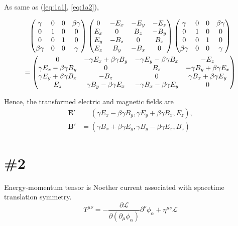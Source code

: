 \documentclass[a4paper,11pt]{article}
\begin{document}
As same as (\ref{eq:1a1}, \ref{eq:1a2}), 

\begin{gather}
    \begin{pmatrix}
        \gamma & 0 & 0 & \beta\gamma \\
        0 & 1 & 0 & 0 \\
        0 & 0 & 1 & 0 \\
        \beta\gamma & 0 & 0 & \gamma
    \end{pmatrix}
    \begin{pmatrix}
        0 & -E_x & -E_y & -E_z \\
        E_x & 0 & B_z & -B_y \\
        E_y & -B_z & 0 & B_x \\
        E_z & B_y & -B_x & 0
    \end{pmatrix}
    \begin{pmatrix}
        \gamma & 0 & 0 & \beta\gamma \\
        0 & 1 & 0 & 0 \\
        0 & 0 & 1 & 0 \\
        \beta\gamma & 0 & 0 & \gamma
    \end{pmatrix}\notag\\
    =\begin{pmatrix}
        0 & -\gamma E_x+\beta\gamma B_y & -\gamma E_y-\beta\gamma B_x & -E_z \\
        \gamma E_x - \beta\gamma B_y & 0 & B_z & -\gamma B_y+\beta\gamma E_x \\
        \gamma E_y + \beta\gamma B_x& -B_z & 0 & \gamma B_x+\beta\gamma E_y \\
        E_z& \gamma B_y - \beta\gamma E_x & -\gamma B_x-\beta\gamma E_y & 0
    \end{pmatrix}
\end{gather}

Hence, the transformed electric and magnetic fields are
\begin{align}
    \mathbf{E}' &= (\gamma E_x - \beta\gamma B_y, \gamma E_y + \beta\gamma B_x, E_z), \\
    \mathbf{B}' &= (\gamma B_x + \beta\gamma E_y, \gamma B_y - \beta\gamma E_x, B_z)
\end{align}


\section{\#2}


Energy-momentum tensor is Noether current associated with spacetime translation symmetry. 
\begin{equation}
    T^{\mu\nu} = -\frac{\partial \mathcal{L}}{\partial(\partial_\mu \phi_\alpha)}\partial^\nu \phi_\alpha + \eta^{\mu\nu}\mathcal{L}
\end{equation}
\end{document}
